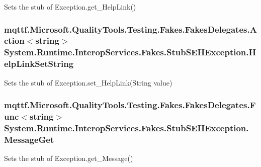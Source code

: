 Sets the stub of Exception.\-get\-\_\-\-Help\-Link()

\hypertarget{class_system_1_1_runtime_1_1_interop_services_1_1_fakes_1_1_stub_s_e_h_exception_a9c96442673a22db2e7248261d6ba8667}{
\subsubsection[{Help\-Link\-Set\-String}]{\setlength{\rightskip}{0pt plus 5cm}mqttf.\-Microsoft.\-Quality\-Tools.\-Testing.\-Fakes.\-Fakes\-Delegates.\-Action$<$string$>$ System.\-Runtime.\-Interop\-Services.\-Fakes.\-Stub\-S\-E\-H\-Exception.\-Help\-Link\-Set\-String}}\label{class_system_1_1_runtime_1_1_interop_services_1_1_fakes_1_1_stub_s_e_h_exception_a9c96442673a22db2e7248261d6ba8667}


Sets the stub of Exception.\-set\-\_\-\-Help\-Link(\-String value)

\hypertarget{class_system_1_1_runtime_1_1_interop_services_1_1_fakes_1_1_stub_s_e_h_exception_afce49e3e9952be7df493d979f3209946}{
\subsubsection[{Message\-Get}]{\setlength{\rightskip}{0pt plus 5cm}mqttf.\-Microsoft.\-Quality\-Tools.\-Testing.\-Fakes.\-Fakes\-Delegates.\-Func$<$string$>$ System.\-Runtime.\-Interop\-Services.\-Fakes.\-Stub\-S\-E\-H\-Exception.\-Message\-Get}}\label{class_system_1_1_runtime_1_1_interop_services_1_1_fakes_1_1_stub_s_e_h_exception_afce49e3e9952be7df493d979f3209946}


Sets the stub of Exception.\-get\-\_\-\-Message()

